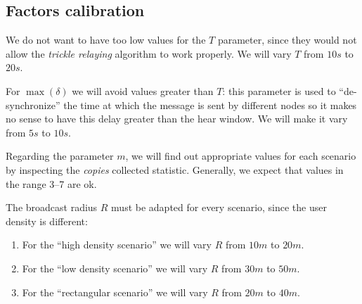 \subsection{Factors calibration}\label{subsec:calibration}

We do not want to have too low values for the \(T\) parameter, since they would
not allow the \emph{trickle relaying} algorithm to work properly. We will vary
\(T\) from \(10s\) to \(20s\).

For \(\max(\delta)\) we will avoid values greater than \(T\): this parameter
is used to ``de-synchronize'' the time at which the message is sent by different
nodes so it makes no sense to have this delay greater than the hear window. We
will make it vary from \(5s\) to \(10s\).

Regarding the parameter \(m\), we will find out appropriate values for each
scenario by inspecting the \textit{copies} collected statistic. Generally, we
expect that values in the range 3--7 are ok.

The broadcast radius \(R\) must be adapted for every scenario, since the user
density is different:
\begin{enumerate}
	\item For the ``high density scenario'' we will vary \(R\) from \(10m\)
		to \(20m\).
	\item For the ``low density scenario'' we will vary \(R\) from \(30m\)
		to \(50m\).
	\item For the ``rectangular scenario'' we will vary \(R\) from \(20m\)
		to \(40m\).
\end{enumerate}
